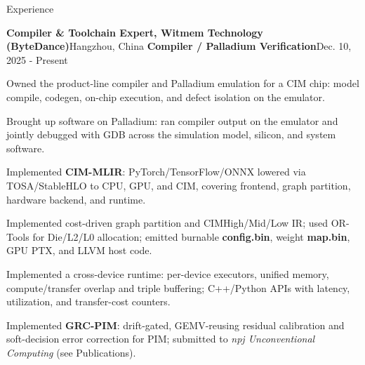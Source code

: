 \documentclass{resume} %
\begin{document}
\begin{rSection}{Experience}

\begin{rSubsection}{\textbf{Compiler \& Toolchain Expert, Witmem Technology (ByteDance)}}{Hangzhou, China}
{\textbf{Compiler / Palladium Verification}}{Dec. 10, 2025 - Present}
\item {Owned the product-line compiler and Palladium emulation for a CIM chip: model compile, codegen, on-chip execution, and defect isolation on the emulator.}\\
\item {Brought up software on Palladium: ran compiler output on the emulator and jointly debugged with GDB across the simulation model, silicon, and system software.}\\
\item {Implemented {\textbf{CIM-MLIR}}: PyTorch/TensorFlow/ONNX lowered via TOSA/StableHLO to CPU, GPU, and CIM, covering frontend, graph partition, hardware backend, and runtime.}\\
\item {Implemented cost-driven graph partition and CIMHigh/Mid/Low IR; used OR-Tools for Die/L2/L0 allocation; emitted burnable {\textbf{config.bin}}, weight {\textbf{map.bin}}, GPU PTX, and LLVM host code.}\\
\item {Implemented a cross-device runtime: per-device executors, unified memory, compute/transfer overlap and triple buffering; C++/Python APIs with latency, utilization, and transfer-cost counters.}\\
\item {Implemented {\textbf{GRC-PIM}}: drift-gated, GEMV-reusing residual calibration and soft-decision error correction for PIM; submitted to \textit{npj Unconventional Computing} (see Publications).}\\
\end{rSubsection}


\end{rSection}
\end{document}
